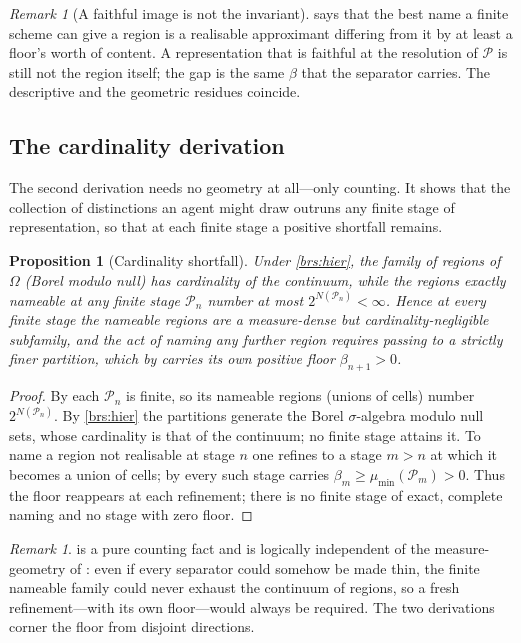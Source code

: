 \documentclass[11pt,a4paper]{article}
\theoremstyle{thmstyle}
\newtheorem{proposition}[theorem]{Proposition}
\theoremstyle{definition}
\theoremstyle{remark}
\newtheorem{remark}[theorem]{Remark}
\newcommand{\Space}{\Omega}
\newcommand{\thick}{\beta}
\newcommand{\Part}{\mathscr{P}}
\begin{document}
\begin{remark}[A faithful image is not the invariant]
\label{rem:faithful}
 says that the best name a finite scheme can give a region
is a realisable approximant differing from it by at least a floor's worth of
content. A representation that is faithful at the resolution of $\Part$ is still
not the region itself; the gap is the same $\thick$ that the separator carries.
The descriptive and the geometric residues coincide.
\end{remark}

\subsection{The cardinality derivation}

The second derivation needs no geometry at all---only counting. It shows that the
collection of distinctions an agent might draw outruns any finite stage of
representation, so that at each finite stage a positive shortfall remains.

\begin{proposition}[Cardinality shortfall]
\label{prop:card}
Under \ref{brs:hier}, the family of regions of $\Space$ \textup{(}Borel modulo
null\textup{)} has cardinality of the continuum, while the regions exactly
nameable at any finite stage $\Part_n$ number at most $2^{N(\Part_n)}<\infty$.
Hence at every finite stage the nameable regions are a measure-dense but
cardinality-negligible subfamily, and the act of naming any further region
requires passing to a strictly finer partition, which by 
carries its own positive floor $\thick_{n+1}>0$.
\end{proposition}

\begin{proof}
By  each $\Part_n$ is finite, so its nameable regions
(unions of cells) number $2^{N(\Part_n)}$. By \ref{brs:hier} the partitions
generate the Borel $\sigma$-algebra modulo null sets, whose cardinality is that
of the continuum; no finite stage attains it. To name a region not realisable at
stage $n$ one refines to a stage $m>n$ at which it becomes a union of cells; by
 every such stage carries $\thick_m\ge\mu_{\min}(\Part_m)>0$.
Thus the floor reappears at each refinement; there is no finite stage of exact,
complete naming and no stage with zero floor.
\end{proof}

\begin{remark}
 is a pure counting fact and is logically independent of the
measure-geometry of : even if every separator could somehow
be made thin, the finite nameable family could never exhaust the continuum of
regions, so a fresh refinement---with its own floor---would always be required.
The two derivations corner the floor from disjoint directions.
\end{remark}
\end{document}
